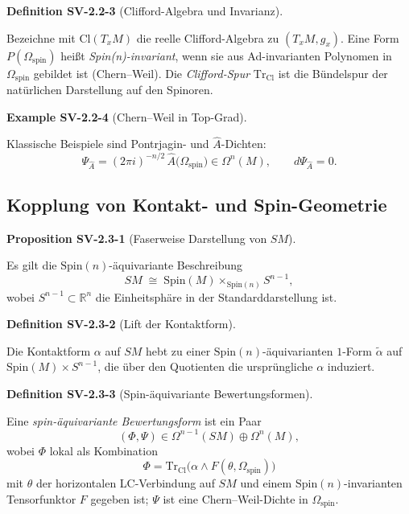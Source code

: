 \documentclass[10pt, letterpaper]{article}
\newcommand{\CustomHeading}[3]{%
  \par\medskip\noindent%
  \textbf{#1 #2} \textnormal{(#3)}.\enskip%
}
\newenvironment{DEF}[2]{\begin{unitbox}\CustomHeading{Definition}{#1}{#2}}{\end{unitbox}}
\newenvironment{PROP}[2]{\begin{unitbox}\CustomHeading{Proposition}{#1}{#2}}{\end{unitbox}}
\newenvironment{EXA}[2]{\begin{unitbox}\CustomHeading{Example}{#1}{#2}}{\end{unitbox}}
\begin{document}
\begin{DEF}{SV-2.2-3}{Clifford-Algebra und Invarianz}
Bezeichne mit $\mathrm{Cl}(T_xM)$ die reelle Clifford-Algebra zu $(T_xM,g_x)$.
Eine Form $P(\Omega_{\mathrm{spin}})$ heißt \emph{Spin(n)-invariant}, wenn sie aus Ad-invarianten Polynomen in $\Omega_{\mathrm{spin}}$ gebildet ist (Chern--Weil). Die \emph{Clifford-Spur} $\mathrm{Tr}_{\mathrm{Cl}}$ ist die Bündelspur der natürlichen Darstellung auf den Spinoren.
\end{DEF}

\begin{EXA}{SV-2.2-4}{Chern--Weil in Top-Grad}
Klassische Beispiele sind Pontrjagin- und $\widehat A$-Dichten:
\[
\Psi_{\widehat A}=(2\pi i)^{-n/2}\,\widehat A\!\big(\Omega_{\mathrm{spin}}\big)\in \Omega^{n}(M),\qquad d\Psi_{\widehat A}=0.
\]
\end{EXA}


\subsection{Kopplung von Kontakt- und Spin-Geometrie}\label{subsec:SV-2.3}

\begin{PROP}{SV-2.3-1}{Faserweise Darstellung von $SM$}
Es gilt die $\mathrm{Spin}(n)$-äquivariante Beschreibung
\[
SM \;\cong\; \mathrm{Spin}(M)\times_{\mathrm{Spin}(n)} S^{n-1},
\]
wobei $S^{n-1}\subset \mathbb R^n$ die Einheitsphäre in der Standarddarstellung ist.
\end{PROP}

\begin{DEF}{SV-2.3-2}{Lift der Kontaktform}
Die Kontaktform $\alpha$ auf $SM$ hebt zu einer $\mathrm{Spin}(n)$-äquivarianten $1$-Form $\widetilde\alpha$ auf $\mathrm{Spin}(M)\times S^{n-1}$, die über den Quotienten die ursprüngliche $\alpha$ induziert.
\end{DEF}

\begin{DEF}{SV-2.3-3}{Spin-äquivariante Bewertungsformen}
Eine \emph{spin-äquivariante Bewertungsform} ist ein Paar
\[
(\Phi,\Psi)\in \Omega^{n-1}(SM)\oplus \Omega^n(M),
\]
wobei $\Phi$ lokal als Kombination
\[
\Phi=\mathrm{Tr}_{\mathrm{Cl}}\!\Big(\alpha\wedge F(\theta,\Omega_{\mathrm{spin}})\Big)
\]
mit $\theta$ der horizontalen LC-Verbindung auf $SM$ und einem $\mathrm{Spin}(n)$-invarianten Tensorfunktor $F$ gegeben ist; $\Psi$ ist eine Chern--Weil-Dichte in $\Omega_{\mathrm{spin}}$.
\end{DEF}
\end{document}
